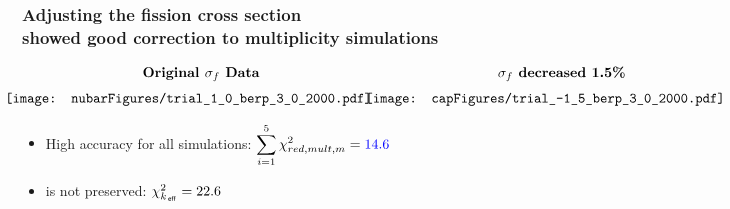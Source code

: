 \begin{frame}
\frametitle{Adjusting the fission cross section \\ showed good correction to multiplicity
simulations}
\begin{center}
$\begin{array}{cc} \textbf{Original \sfiss Data} & \hspace{0.13in}\textbf{\sfiss decreased
    1.5\%} \\[6pt]
   \hspace{-0.25in}
\texttt{[image: nubarFigures/trial\_1\_0\_berp\_3\_0\_2000.pdf]} &
\hspace{-0.2in}\texttt{[image: capFigures/trial\_-1\_5\_berp\_3\_0\_2000.pdf]} \\
\end{array}$
\end{center}
\begin{itemize} \vspace{-0.1in} 
  \item High accuracy for all simulations: $\displaystyle \sum_{i=1}^5 \chi^2_{red,mult,m} = {\color{blue} 14.6}$
      \vspace{-0.2in}
  \item \keff is not preserved: $\chi^2_{k_{\,\mathsf{eff}}} = 22.6$
\end{itemize} 
\end{frame}






